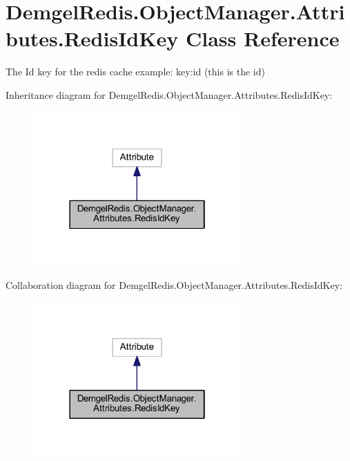 \hypertarget{class_demgel_redis_1_1_object_manager_1_1_attributes_1_1_redis_id_key}{}\section{Demgel\+Redis.\+Object\+Manager.\+Attributes.\+Redis\+Id\+Key Class Reference}
\label{class_demgel_redis_1_1_object_manager_1_1_attributes_1_1_redis_id_key}


The Id key for the redis cache example\+: key\+:id (this is the id)  




Inheritance diagram for Demgel\+Redis.\+Object\+Manager.\+Attributes.\+Redis\+Id\+Key\+:
\nopagebreak
\begin{figure}[H]
\begin{center}
\leavevmode
\includegraphics[width=226pt]{class_demgel_redis_1_1_object_manager_1_1_attributes_1_1_redis_id_key__inherit__graph}
\end{center}
\end{figure}


Collaboration diagram for Demgel\+Redis.\+Object\+Manager.\+Attributes.\+Redis\+Id\+Key\+:
\nopagebreak
\begin{figure}[H]
\begin{center}
\leavevmode
\includegraphics[width=226pt]{class_demgel_redis_1_1_object_manager_1_1_attributes_1_1_redis_id_key__coll__graph}
\end{center}
\end{figure}


